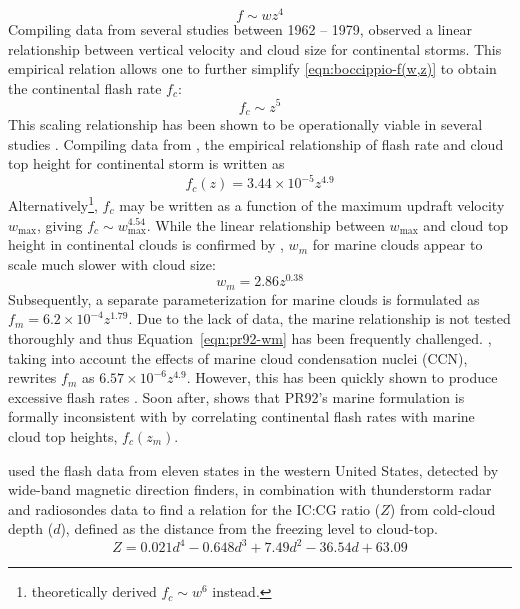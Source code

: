 	\begin{equation}\label{eqn:boccippio-f(w,z)}
		f\sim wz^4
	\end{equation}
	Compiling data from several studies between 1962 -- 1979, \citet{Williams:1985fk} observed a linear relationship between vertical velocity and cloud size for continental storms. This empirical relation allows one to further simplify \ref{eqn:boccippio-f(w,z)} to obtain the continental flash rate $f_c$:
	\begin{equation}\label{eqn:w85-f(z)}
		f_c\sim z^5
	\end{equation}
	This scaling relationship has been shown to be operationally viable in several studies \citep[e.g.][]{Yoshida:2009vn, Ushio:2001kx}. Compiling data from \citet{Williams:1985fk}, the empirical relationship of flash rate and cloud top height for continental storm is written as \citep[][hereafter PR92]{Price:1992wb}
	\begin{equation}\label{eqn:pr92-fc(z)}
		f_c(z) = 3.44\times10^{-5}z^{4.9}
	\end{equation}
	Alternatively\footnote{\citet{Baker:1995uq} theoretically derived $f_c\sim w^6$ instead.}, $f_c$ may be written as a function of the maximum updraft velocity $w_{\max}$, giving $f_c\sim w_{\max}^{4.54}$. While the linear relationship between $w_{\max}$ and cloud top height in continental clouds is confirmed by \citet{Price:1992wb}, $w_m$ for marine clouds appear to scale much slower with cloud size:
	\begin{equation}\label{eqn:pr92-wm}
		w_m = 2.86z^{0.38}
	\end{equation}
	Subsequently, a separate parameterization for marine clouds is formulated as $f_m=6.2\times10^{-4}z^{1.79}$. Due to the lack of data, the marine relationship is not tested thoroughly and thus Equation~\ref{eqn:pr92-wm} has been frequently challenged. \citet{Michalon:1999fk}, taking into account the effects of marine cloud condensation nuclei (CCN), rewrites $f_m$ as $6.57\times10^{-6}z^{4.9}$. However, this has been quickly shown to produce excessive flash rates \citep{Jourdian:2001pi}. Soon after, \citet{Boccippio:2002uq} shows that PR92's marine formulation is formally inconsistent with \citet{Vonnegut:1963aa} by correlating continental flash rates with marine cloud top heights, {\ie} $f_c(z_m)$.

	\citet{Price:1993fk} used the flash data from eleven states in the western United States, detected by wide-band magnetic direction finders, in combination with thunderstorm radar and radiosondes data to find a relation for the IC:CG ratio ($Z$) from cold-cloud depth ($d$), defined as the distance from the freezing level to cloud-top.
	\begin{equation}\label{eqn:pr93-Z}
		Z = 0.021d^4-0.648d^3+7.49d^2-36.54d + 63.09
	\end{equation}
	
